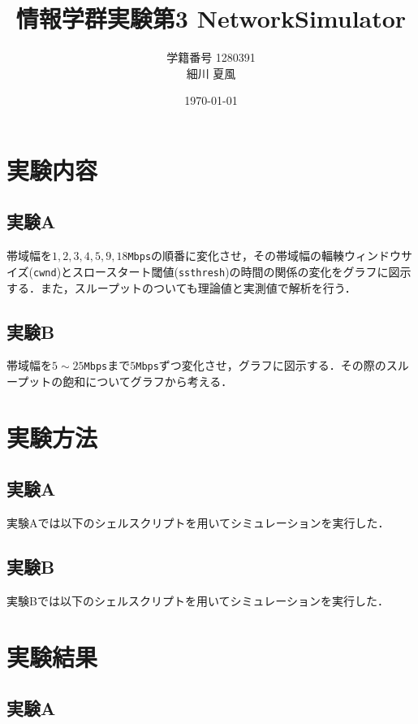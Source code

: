 \documentclass[paper=a4, fontsize=10pt]{jlreq}
\title{情報学群実験第3 NetworkSimulator}
\author{学籍番号 1280391 \\ 細川 夏風}
\date{\today}
\begin{document}
\maketitle
\section{実験内容}
\subsection{実験A}
帯域幅を$1, 2, 3, 4, 5, 9, 18$\texttt{Mbps}の順番に変化させ，その帯域幅の輻輳ウィンドウサイズ(\texttt{cwnd})とスロースタート閾値(\texttt{ssthresh})の時間の関係の変化をグラフに図示する．また，スループットのついても理論値と実測値で解析を行う．
\subsection{実験B}
帯域幅を$5 \sim 25$\texttt{Mbps}まで$5$\texttt{Mbps}ずつ変化させ，グラフに図示する．その際のスループットの飽和についてグラフから考える． 

\section{実験方法}
\subsection{実験A}
実験Aでは以下のシェルスクリプトを用いてシミュレーションを実行した．



\subsection{実験B}
実験Bでは以下のシェルスクリプトを用いてシミュレーションを実行した．



\newpage

\section{実験結果}
\subsection{実験A}
\end{document}
